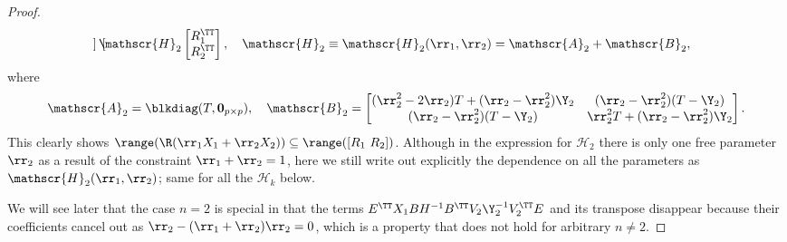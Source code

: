 \begin{proof}
\begin{equation*}
\begin{bmatrix}
	\end{bmatrix}\mathscr{H}_2\begin{bmatrix}
		R_1^\TT \\ R_2^\TT
	\end{bmatrix},\quad
	\mathscr{H}_2\equiv  \mathscr{H}_2(\rr_1,\rr_2) = \mathscr{A}_2 + \mathscr{B}_2,
\end{equation*}
where
\begin{equation*}
	\mathscr{A}_2 = \blkdiag(T, \textbf{0}_{p\times p}),\quad
	\mathscr{B}_2 = \begin{bmatrix}
		(\rr_2^2-2\rr_2)T+(\rr_2-\rr_2^2)\Y_2 & (\rr_2-\rr_2^2)(T-\Y_2) \\
		(\rr_2-\rr_2^2)(T-\Y_2)    &  \rr_2^2 T +(\rr_2-\rr_2^2)\Y_2
	\end{bmatrix}.
\end{equation*}
This clearly shows $\range (\R(\rr_1X_1 + \rr_2X_2))\subseteq \range([R_1\ R_2])$.
Although in the expression for $\mathscr{H}_2$ there is only one free parameter $\rr_2$ as a result of the constraint $\rr_1+\rr_2=1$, here we still write out explicitly the dependence on all the parameters as $\mathscr{H}_2(\rr_1,\rr_2)$; same for all the
$\mathscr{H}_k$ below.

We will see later that the case $n=2$ is special in that the terms
$E^\TT X_1BH^{-1}B^\TT V_2\Y_2^{-1}V_2^\TT E$ and its transpose disappear because their
coefficients cancel out as $\rr_2-(\rr_1+\rr_2)\rr_2=0$, which is a property that does not hold for
arbitrary $n\neq 2$.


\end{proof}

